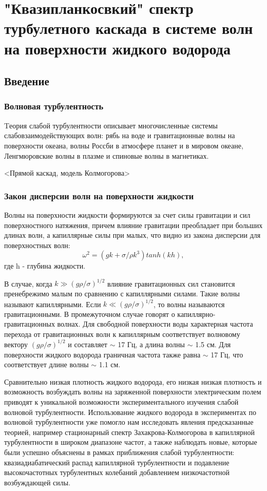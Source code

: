 \chapter{"Квазипланкосвкий" спектр турбулетного каскада в системе волн на поверхности жидкого водорода}\label{chapt1}
\section{Введение}
\subsection{Волновая турбулентность} \label{subsect1_turb}
Tеория слабой турбулентности описывает многочисленные системы слабовзаимодействующих волн: рябь на воде и гравитационные волны на поверхности океана, волны Россби в атмосфере планет и в мировом океане, Ленгмюровские волны в плазме и спиновые волны в магнетиках.

<Прямой каскад, модель Колмогорова>
\subsection{Закон дисперсии волн на поверхности жидкости} \label{subsect1_disper}

Волны на поверхности жидкости формируются за счет силы гравитации и сил поверхностного натяжения, причем влияние гравитации преобладает при больших длинах волн, а капиллярные силы при малых, что видно из закона дисперсии для поверхностных волн: 
\begin{equation}
 \label{eq:disper}
\omega^2 = (gk + \sigma/\rho k^3)tanh(kh),
\end{equation}
где h - глубина жидкости.

В случае, когда $k \gg (g\rho/\sigma)^{1/2}$ влияние гравитационных сил становится пренебрежимо малым по сравнению 
с капиллярными силами. Такие волны называют капиллярными. Если $k \ll (g\rho/\sigma)^{1/2}$, то волны называются 
гравитационными. В промежуточном случае говорят о капиллярно-гравитационных волнах. Для свободной поверхности воды характерная частота перехода от гравитационных волн к капиллярным соответствует волновому вектору $(g\rho/\sigma)^{1/2}$ и составляет $\sim$ 17 Гц, а длина волны $\sim$ 1.5 см. Для поверхности жидкого водорода граничная частота также равна $\sim$ 17 Гц, что соответствует длине волны $\sim$ 1.1 см.

Сравнительно низкая плотность жидкого водорода, его низкая низкая плотность и возможность возбуждать волны на заряженной поверхности электрическим полем приводят к уникальной возможности экспериментального изучения слабой волновой турбулентности. Использование жидкого водорода в экспериментах по волновой турбулентности уже помогло нам исследовать явления предсказанные теорией, например стационарный  спектр Захакрова-Колмогорова в капиллярной турбулентности в широком диапазоне частот, а также наблюдать новые, которые были успешно объяснены в рамках  приближения слабой турбулентности: квазиадиабатический распад капиллярной турбулентности и подавление высокочастотных турбулентных колебаний добавлением низкочастотной возбуждающей силы.

